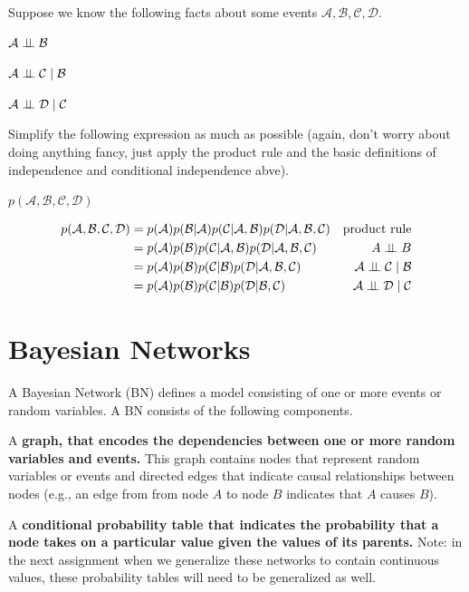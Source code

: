 \documentclass{tufte-handout}
\begin{document}
\begin{exercise}
Suppose we know the following facts about some events $\mathcal{A}, \mathcal{B}, \mathcal{C}, \mathcal{D}$.
\bi
\item $\mathcal{A} \perp\!\!\!\perp \mathcal{B}$
\item $\mathcal{A} \perp\!\!\!\perp \mathcal{C} \mid \mathcal{B}$
\item $\mathcal{A} \perp\!\!\!\perp \mathcal{D} \mid \mathcal{C}$
\ei

\noindent Simplify the following expression as much as possible (again, don't worry about doing anything fancy, just apply the product rule and the basic definitions of independence and conditional independence abve).

$p(\mathcal{A}, \mathcal{B}, \mathcal{C}, \mathcal{D})$

\begin{boxedsolution}
\begin{align}
p(\mathcal{A}, \mathcal{B}, \mathcal{C}, \mathcal{D}) &= p(\mathcal{A}) p(\mathcal{B}|\mathcal{A}) p(\mathcal{C} | \mathcal{A}, \mathcal{B}) p(\mathcal{D}|\mathcal{A}, \mathcal{B}, \mathcal{C}) & \mbox{product rule} \nonumber \\
&= p(\mathcal{A}) p(\mathcal{B})p(\mathcal{C} | \mathcal{A}, \mathcal{B}) p(\mathcal{D}|\mathcal{A}, \mathcal{B}, \mathcal{C}) & A \condindep B \nonumber \\
&= p(\mathcal{A}) p(\mathcal{B})p(\mathcal{C} |\mathcal{B}) p(\mathcal{D}|\mathcal{A}, \mathcal{B}, \mathcal{C}) & \mathcal{A} \condindep \mathcal{C} \mid \mathcal{B} \nonumber \\
&=  p(\mathcal{A}) p(\mathcal{B})p(\mathcal{C} |\mathcal{B}) p(\mathcal{D}| \mathcal{B}, \mathcal{C}) & \mathcal{A} \condindep \mathcal{D} \mid \mathcal{C}\nonumber
\end{align}
\end{boxedsolution}
\end{exercise}

\section{Bayesian Networks}

A Bayesian Network (BN) defines a model consisting of one or more events or random variables.  A BN consists of the following components.
\bi
\item A \textbf{graph, that encodes the dependencies between one or more random variables and events.}  This graph contains nodes that represent random variables or events and directed edges that indicate causal relationships between nodes (e.g., an edge from from node $A$ to node $B$ indicates that $A$ causes $B$).
\item A \textbf{conditional probability table that indicates the probability that a node takes on a particular value given the values of its parents.}  Note: in the next assignment when we generalize these networks to contain continuous values, these probability tables will need to be generalized as well.
\ei
\end{document}
